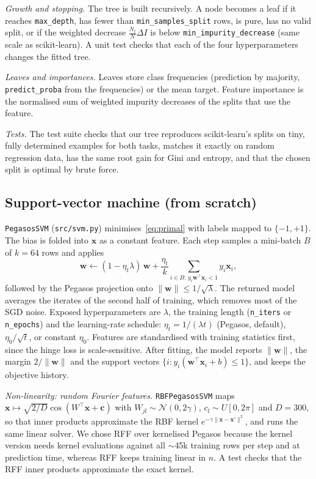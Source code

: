 \documentclass[10pt,twocolumn,a4paper]{article}
\begin{document}
\emph{Growth and stopping.} The tree is built recursively. A node becomes a
leaf if it reaches \texttt{max\_depth}, has fewer than
\texttt{min\_samples\_split} rows, is pure, has no valid split, or if the
weighted decrease $\frac{N_t}{N}\Delta I$ is below
\texttt{min\_impurity\_decrease} (same scale as scikit-learn). A unit test
checks that each of the four hyperparameters changes the fitted tree.

\emph{Leaves and importances.} Leaves store class frequencies (prediction
by majority, \texttt{predict\_proba} from the frequencies) or the mean
target. Feature importance is the normalised sum of weighted impurity
decreases of the splits that use the feature.

\emph{Tests.} The test suite checks that our tree reproduces scikit-learn's
splits on tiny, fully determined examples for both tasks, matches it exactly
on random regression data, has the same root gain for Gini and entropy, and
that the chosen split is optimal by brute force.

\subsection{Support-vector machine (from scratch)}
\texttt{PegasosSVM} (\texttt{src/svm.py}) minimises~\eqref{eq:primal}
with labels mapped to $\{-1,+1\}$. The bias is folded into $\mathbf x$ as a
constant feature. Each step samples a mini-batch $B$ of $k=64$ rows and
applies
\begin{equation}
  \mathbf w \leftarrow (1-\eta_t\lambda)\,\mathbf w
  + \frac{\eta_t}{k}\sum_{i\in B:\,y_i\mathbf w^\top\mathbf x_i<1} y_i\mathbf x_i ,
\end{equation}
followed by the Pegasos projection onto
$\lVert\mathbf w\rVert\le 1/\sqrt\lambda$. The returned model averages the
iterates of the second half of training, which removes most of the SGD
noise. Exposed hyperparameters are $\lambda$, the training length
(\texttt{n\_iters} or \texttt{n\_epochs}) and the learning-rate schedule:
$\eta_t=1/(\lambda t)$ (Pegasos, default), $\eta_0/\sqrt t$, or constant
$\eta_0$. Features are standardised with training statistics first, since
the hinge loss is scale-sensitive. After fitting, the model reports
$\lVert\mathbf w\rVert$, the margin $2/\lVert\mathbf w\rVert$ and the
support vectors $\{i: y_i(\mathbf w^\top\mathbf x_i+b)\le 1\}$, and keeps
the objective history.

\emph{Non-linearity: random Fourier features.} \texttt{RBFPegasosSVM} maps
$\mathbf x\mapsto\sqrt{2/D}\cos(W^\top\mathbf x+\mathbf c)$ with
$W_{jl}\sim\mathcal N(0,2\gamma)$, $c_l\sim U[0,2\pi]$ and $D=300$, so that
inner products approximate the RBF kernel $e^{-\gamma\lVert\mathbf
x-\mathbf x'\rVert^2}$, and runs the same linear solver. We chose RFF over
kernelised Pegasos because the kernel version needs kernel evaluations
against all $\sim$45k training rows per step and at prediction time,
whereas RFF keeps training linear in $n$. A test checks that the RFF inner
products approximate the exact kernel.
\end{document}
